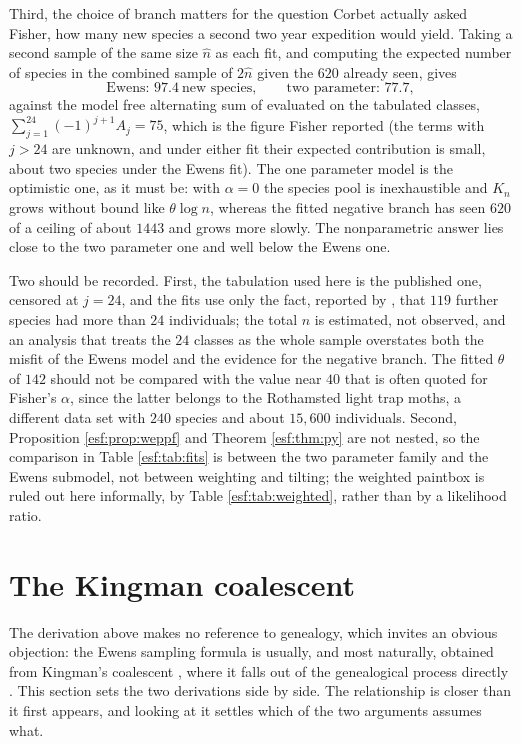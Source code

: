 Third, the choice of branch matters for the question Corbet actually asked Fisher, how
many new species a second two year expedition would yield. Taking a second sample of the same size $\hat n$ as each fit, and computing the expected number of species in the combined sample of $2\hat n$ given the $620$ already seen, gives
\[
\text{Ewens: } 97.4 \ \text{new species}, \qquad
\text{two parameter: } 77.7 ,
\]
against the model free alternating sum of \citet{esf:good1956} evaluated on the
tabulated classes, $\sum_{j=1}^{24} (-1)^{j+1} A_j = 75$, which is the figure Fisher reported (the terms with $j > 24$ are unknown, and under either fit their expected contribution is small, about two species under the Ewens fit).
The one parameter model is the optimistic one, as it must be: with $\alpha = 0$ the
species pool is inexhaustible and $K_n$ grows without bound like $\theta \log n$,
whereas the fitted negative branch has seen $620$ of a ceiling of about
$1443$ and grows more slowly. The nonparametric answer lies close to the two parameter one and well below the Ewens one.

\begin{remark}[Caveats]
Two should be recorded. First, the tabulation used here is the published one, censored at
$j = 24$, and the fits use only the fact, reported by \citet{esf:fisher1943}, that $119$ further species had more than $24$ individuals; the total $n$ is estimated, not observed, and an analysis that treats the $24$ classes as the whole sample overstates both the misfit of the Ewens model and the evidence for the negative branch. The fitted $\theta$
of $142$ should not be compared with the value near $40$ that is often quoted for
Fisher's $\alpha$, since the latter belongs to the Rothamsted light trap moths, a
different data set with $240$ species and about $15{,}600$ individuals. Second,
Proposition \ref{esf:prop:weppf} and Theorem \ref{esf:thm:py} are not nested, so the
comparison in Table \ref{esf:tab:fits} is between the two parameter family and the Ewens
submodel, not between weighting and tilting; the weighted paintbox is ruled out here
informally, by Table \ref{esf:tab:weighted}, rather than by a likelihood ratio.
\end{remark}

\section{The Kingman coalescent}
\label{esf:sec:coalescent}

The derivation above makes no reference to genealogy, which invites an obvious
objection: the Ewens sampling formula is usually, and most naturally, obtained from
Kingman's coalescent \citep{esf:kingman1982a,esf:kingman1982b}, where it falls out of the
genealogical process directly \citep{esf:griffiths1979,esf:ewens2004}. This section sets the
two derivations side by side. The relationship is closer than it first appears, and
looking at it settles which of the two arguments assumes what.

